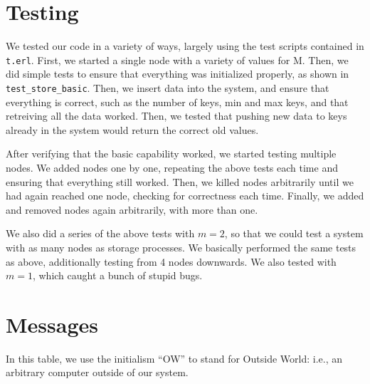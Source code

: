 \documentclass[12pt,letterpaper]{article}
\renewcommand{\tt}[1]{\texttt{#1}}
\begin{document}
\section*{Testing}

We tested our code in a variety of ways, largely using the test scripts contained in \tt{t.erl}. First, we started a single node with a variety of values for M. Then, we did simple tests to ensure that everything was initialized properly, as shown in \tt{test\_store\_basic}. Then, we insert data into the system, and ensure that everything is correct, such as the number of keys, min and max keys, and that retreiving all the data worked. Then, we tested that pushing new data to keys already in the system would return the correct old values.

After verifying that the basic capability worked, we started testing multiple nodes. We added nodes one by one, repeating the above tests each time and ensuring that everything still worked. Then, we killed nodes arbitrarily until we had again reached one node, checking for correctness each time. Finally, we added and removed nodes again arbitrarily, with more than one.

We also did a series of the above tests with $m = 2$, so that we could test a system with as many nodes as storage processes. We basically performed the same tests as above, additionally testing from 4 nodes downwards. We also tested with $m=1$, which caught a bunch of stupid bugs.

\section*{Messages}
In this table, we use the initialism ``OW'' to stand for Outside World: i.e., an arbitrary computer outside of our system.

\singlespacing
\setlength{\extrarowheight}{5pt}
\setlength{\LTcapwidth}{\textwidth}
\end{document}
